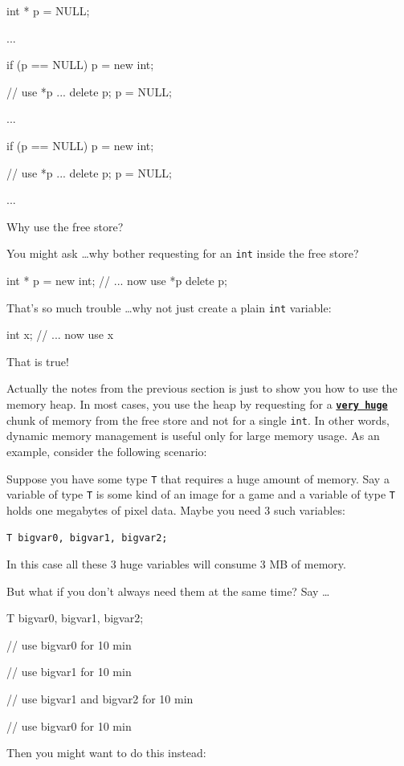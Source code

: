 \begin{consolethree}[escapeinside=||]
int * p = NULL;

...

if (p == NULL)
{
    p = new int;
}

// use *p ...
delete p;
p = NULL;

...

if (p == NULL)
{
    p = new int;
}

// use *p ...
delete p;
p = NULL;

...
\end{consolethree}
Why use the free store?

You might ask \ldots why bother requesting for an \texttt{int} inside the free store?

\begin{consolethree}[escapeinside=||]
int * p = new int;
// ... now use *p
delete p;
\end{consolethree}
That's so much trouble \ldots why not just create a plain \texttt{int} variable:

\begin{consolethree}[escapeinside=||]
int x;
// ... now use x
\end{consolethree}
That is true!

Actually the notes from the previous section is just to show you how to use the memory heap. In most cases, you use the heap by requesting for a \texttt{\textbf{\underline{very huge}}} chunk of memory from the free store and not for a single \texttt{int}. In other words, dynamic memory management is useful only for large memory usage. As an example, consider the following scenario:

Suppose you have some type \texttt{T} that requires a huge amount of memory. Say a variable of type \texttt{T} is some kind of an image for a game and a variable of type \texttt{T} holds one megabytes of pixel data. Maybe you need 3 such variables:

\begin{center}
\texttt{T bigvar0, bigvar1, bigvar2;}
\end{center}

In this case all these 3 huge variables will consume 3 MB of memory.

But what if you don't always need them at the same time? Say \ldots

\begin{consolethree}[escapeinside=||]
T bigvar0, bigvar1, bigvar2;

// use bigvar0 for 10 min

// use bigvar1 for 10 min

// use bigvar1 and bigvar2 for 10 min

// use bigvar0 for 10 min 
\end{consolethree}
Then you might want to do this instead:

